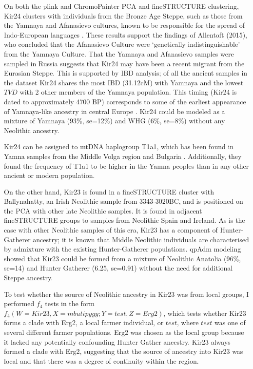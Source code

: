 On both the plink and ChromoPainter PCA and fineSTRUCTURE clustering, Kir24 clusters with individuals from the Bronze Age Steppe, such as those from the Yamnaya and Afanasievo cultures, known to be responsible for the spread of Indo-European languages \cite{Haak2015}. These results support the findings of Allentoft (2015), who concluded that the Afanasievo Culture were `genetically indistinguishable' from the Yamnaya Culture. That the Yamnaya and Afanasievo samples were sampled in Russia suggests that Kir24 may have been a recent migrant from the Eurasian Steppe. This is supported by IBD analysis; of all the ancient samples in the dataset Kir24 shares the most IBD (31.12cM) with Yamnaya and the lowest $TVD$ with 2 other members of the Yamnaya population. This timing (Kir24 is dated to approximately 4700 BP) corresponds to some of the earliest appearance of Yamnaya-like ancestry in central Europe \cite{Racimo8989}. Kir24 could be modeled as a mixture of Yamnaya (93\%, se=12\%) and WHG (6\%, se=8\%) without any Neolithic ancestry. 

Kir24 can be assigned to mtDNA haplogroup T1a1, which has been found in Yamna samples from the Middle Volga region and Bulgaria \cite{keyser2009ancient}. Additionally, they found the frequency of T1a1 to be higher in the Yamna peoples than in any other ancient or modern population. 

On the other hand, Kir23 is found in a fineSTRUCTURE cluster with Ballynahatty, an Irish Neolithic sample from 3343-3020BC, and is positioned on the PCA with other late Neolithic samples. It is found in adjacent fineSTRUCTURE groups to samples from Neolithic Spain and Ireland. As is the case with other Neolithic samples of this era, Kir23 has a component of Hunter-Gatherer ancestry; it is known that Middle Neolithic individuals are characterised by admixture with the existing Hunter-Gatherer populations. qpAdm modeling showed that Kir23 could be formed from a mixture of Neolithic Anatolia (96\%, se=14)  and Hunter Gatherer (6.25, se=0.91) without the need for additional Steppe ancestry. 

To test whether the source of Neolithic ancestry in Kir23 was from local groups, I performed $f_{4}$ tests in the form $f_{4}(W=Kir23, X=mbutipygy; Y=test, Z=Erg2)$, which tests whether Kir23 forms a clade with Erg2, a local farmer individual, or $test$, where $test$ was one of several different farmer populations. Erg2 was chosen as the local group because it lacked any potentially confounding Hunter Gather ancestry. Kir23 always formed a clade with Erg2, suggesting that the source of ancestry into Kir23 was local and that there was a degree of continuity within the region. 


